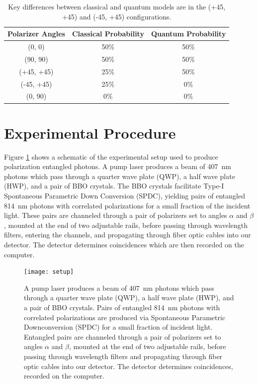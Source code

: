 \documentclass{article}
\begin{document}
\begin{table}[!h]
  \centering
  \begin{tabular}{ c c c }
    Polarizer Angles & Classical Probability & Quantum Probability \\ \hline
    (0, 0)     & 50\% & 50\% \\
    (90, 90)   & 50\% & 50\% \\
    (+45, +45) & 25\% & 50\% \\
    (-45, +45) & 25\% &  0\% \\
    (0, 90)    &  0\% &  0\%
  \end{tabular}
  \caption{Key differences between classical and quantum models are in the (+45, +45) and (-45, +45) configurations. \label{tab:vs}}
\end{table}

\section{Experimental Procedure}

Figure \ref{fig:setup} shows a schematic of the experimental setup used to produce polarization entangled photons. A pump laser produces a beam of 407~nm photons which pass through a quarter wave plate (QWP), a half wave plate (HWP), and a pair of BBO crystals. The BBO crystals facilitate Type-I Spontaneous Parametric Down Conversion (SPDC), yielding pairs of entangled 814~nm photons with correlated polarizations for a small fraction of the incident light. These pairs are channeled through a pair of polarizers set to angles $\alpha$ and $\beta$, mounted at the end of two adjustable rails, before passing through wavelength filters, entering the channels, and propagating through fiber optic cables into our detector. The detector determines coincidences which are then recorded on the computer.

\begin{figure}[!h]
  \centering
  \texttt{[image: setup]}
  \caption{A pump laser produces a beam of 407~nm photons which pass through a quarter wave plate (QWP), a half wave plate (HWP), and a pair of BBO crystals. Pairs of entangled 814~nm photons with correlated polarizations are produced via Spontaneous Parametric Downconversion (SPDC) for a small fraction of incident light. Entangled pairs are channeled through a pair of polarizers set to angles $\alpha$ and $\beta$, mounted at the end of two adjustable rails, before passing through wavelength filters and propagating through fiber optic cables into our detector. The detector determines coincidences, recorded on the computer. \label{fig:setup}}
\end{figure}
\end{document}
